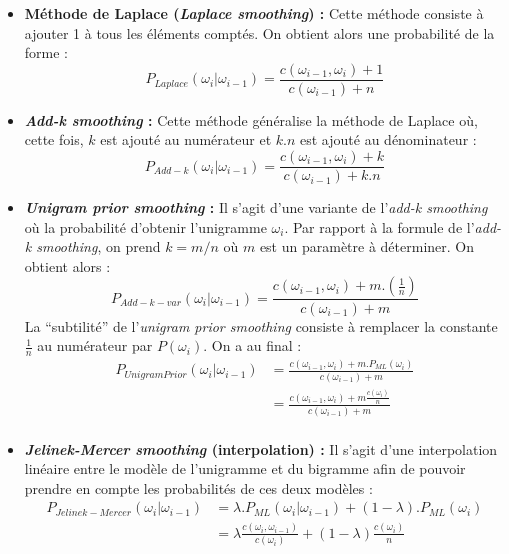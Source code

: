 \documentclass[a4paper,titlepage]{report}
\begin{document}
\begin{itemize}
	\item \textbf{Méthode de Laplace (\textit{Laplace smoothing}) :} Cette méthode consiste à ajouter 1 à tous les éléments comptés. On obtient alors une probabilité de la forme : 
	\[
		P_{Laplace} (\omega_i | \omega_{i-1}) = \frac{c(\omega_{i-1}, \omega_i) + 1}{c(\omega_{i-1}) + n}
	\]
	\item \textbf{\textit{Add-k smoothing} :} Cette méthode généralise la méthode de Laplace où, cette fois, $k$ est ajouté au numérateur et $k.n$ est ajouté au dénominateur : 
	\[
		P_{Add-k} (\omega_i | \omega_{i-1}) = \frac{c(\omega_{i-1}, \omega_i) + k}{c(\omega_{i-1}) + k.n}
	\]
	\item \textbf{\textit{Unigram prior smoothing} :} Il s'agit d'une variante de l'\textit{add-k smoothing} où la probabilité d'obtenir l'unigramme $\omega_i$. Par rapport à la formule de l'\textit{add-k smoothing}, on prend $k = m/n$ où $m$ est un paramètre à déterminer. On obtient alors : 
	\[
		P_{Add-k-var} (\omega_i | \omega_{i-1}) = \frac{c(\omega_{i-1}, \omega_i) + m . \left(\frac{1}{n}\right)}{c(\omega_{i-1}) + m}
	\]
	La ``subtilité'' de l'\textit{unigram prior smoothing} consiste à remplacer la constante $\frac{1}{n}$ au numérateur par $P(\omega_i)$. On a au final : 
	\[
	\begin{aligned}
		P_{UnigramPrior} (\omega_i | \omega_{i-1}) 
			&= \frac{c(\omega_{i-1}, \omega_i) + m . P_{ML}(\omega_i)}{c(\omega_{i-1}) + m}\\
			&= \frac{c(\omega_{i-1}, \omega_i) + m \frac{c(\omega_i)}{n}}{c(\omega_{i-1}) + m}\\
	\end{aligned}
	\]
	\item \textbf{\textit{Jelinek-Mercer smoothing} (interpolation) :} Il s'agit d'une interpolation linéaire entre le modèle de l'unigramme et du bigramme afin de pouvoir prendre en compte les probabilités de ces deux modèles : 
	\[
	\begin{aligned}
		P_{Jelinek-Mercer} (\omega_i | \omega_{i-1}) 
			&= \lambda . P_{ML}(\omega_i | \omega_{i-1}) + (1 - \lambda) . P_{ML}(\omega_i)\\
			&= \lambda \frac{c(\omega_i, \omega_{i-1})}{c(\omega_i)} + (1 - \lambda) \frac{c(\omega_i)}{n}
	\end{aligned}
	\]	 
\end{itemize}
\end{document}

